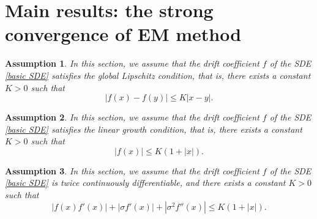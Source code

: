 \documentclass[10pt,reqno,final]{amsart}
\theoremstyle{plain}
\newtheorem{assumption}{Assumption}[section]
\theoremstyle{definition}
\theoremstyle{remark}
\numberwithin{equation}{section}
\numberwithin{figure}{section}
\numberwithin{table}{section}
\begin{document}
\section{Main results: the strong convergence of EM method}

\begin{assumption}\label{Lipschitz}
	In this section, we assume that the drift coefficient \(f\) of the SDE \cref{basic SDE} satisfies the global \textnormal{Lipschitz} condition, that is, there exists a constant \(K > 0\) such that
	\begin{equation}
		|f(x) - f(y)| \le K|x - y|.
	\end{equation}
\end{assumption}

\begin{assumption}\label{linear growth}
	In this section, we assume that the drift coefficient \(f\) of the SDE \cref{basic SDE} satisfies the linear growth condition, that is, there exists a constant \(K > 0\) such that
	\begin{equation}
		|f(x)| \le K(1 + |x|).
	\end{equation}
\end{assumption}

\begin{assumption}\label{momentEM}
	In this section, we assume that the drift coefficient \(f\) of the SDE \cref{basic SDE} is twice continuously differentiable, and there exists a constant \(K > 0\) such that
	\begin{equation}
		|f(x)f'(x)| + |\sigma f'(x)| + |\sigma^2 f''(x)| \leq K(1 + |x|).
	\end{equation}
\end{assumption}
\end{document}
